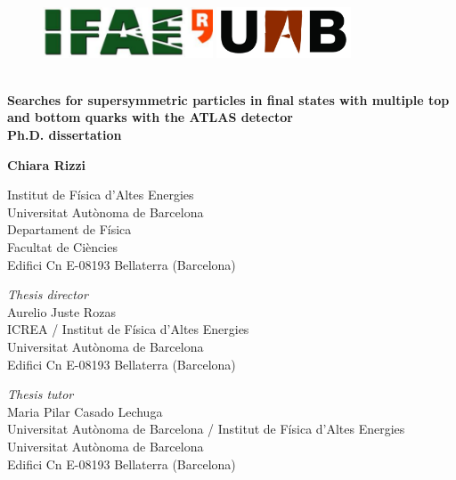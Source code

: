 \begin{titlepage}
\begin{center}

\begin{figure}[h!]
\includegraphics[height=15mm]{figures/front/IFAE_logo}
\hfill
\includegraphics[height=15mm]{figures/front/uab_logo}
\end{figure}
 
\vspace{0.5cm}
\HRule\\
\vspace{0.2cm}
{\huge \bf Searches for supersymmetric particles in final states with multiple top and bottom quarks with the ATLAS detector\\
\vspace{1cm}
Ph.D. dissertation}
\HRule\\
\par
\vspace{1.5in}
 
{\LARGE \bf Chiara Rizzi}
\vspace{0.3cm}
\par
Institut de F\'{i}sica d'Altes Energies\\
Universitat Aut\`{o}noma de Barcelona\\
Departament de F\'{i}sica\\
Facultat de Ci\`{e}ncies \\
Edifici Cn E-08193 Bellaterra (Barcelona)
\par
\vspace{0.5in}
 
 
\vfill
{\it Thesis director}\\
Aurelio Juste Rozas\\
ICREA / Institut de F\'{i}sica d'Altes Energies\\
Universitat Aut\`{o}noma de Barcelona\\
Edifici Cn E-08193 Bellaterra (Barcelona)

\vfill
{\it Thesis tutor}\\
Maria Pilar Casado Lechuga\\
Universitat Aut\`{o}noma de Barcelona / Institut de F\'{i}sica d'Altes Energies\\
Universitat Aut\`{o}noma de Barcelona\\
Edifici Cn E-08193 Bellaterra (Barcelona)

\end{center}
\end{titlepage}
